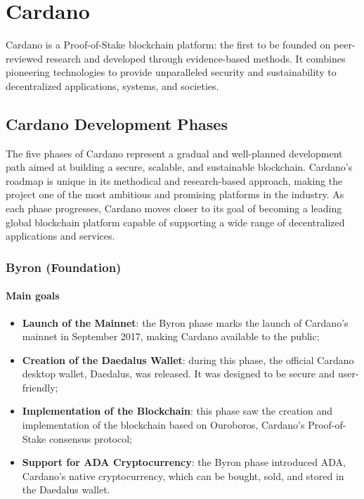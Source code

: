 \chapter{Cardano}

Cardano is a \gls{Proof-of-Stake} blockchain platform: the first 
to be founded on peer-reviewed research and developed through 
evidence-based methods. It combines pioneering technologies 
to provide unparalleled security and sustainability to decentralized 
applications, systems, and societies.

\section{Cardano Development Phases}

The five phases of Cardano represent a gradual and well-planned development 
path aimed at building a secure, scalable, and sustainable blockchain. 
Cardano's roadmap is unique in its methodical and research-based approach, 
making the project one of the most ambitious and promising platforms in the 
industry. As each phase progresses, Cardano moves closer to its goal of 
becoming a leading global blockchain platform capable of supporting a wide 
range of decentralized applications and services.

\vspace{0.2cm}

\subsection{Byron (Foundation)}

\subsubsection*{Main goals}
\begin{itemize}
    \item \textbf{Launch of the Mainnet}: the Byron phase marks the launch of 
        Cardano's mainnet in September 2017, making Cardano available 
        to the public;
    \item \textbf{Creation of the Daedalus Wallet}: during this phase, the 
        official Cardano desktop wallet, Daedalus, was released. It was 
        designed to be secure and user-friendly;

    \item \textbf{Implementation of the Blockchain}: this phase saw the 
        creation and implementation of the blockchain based on Ouroboros, 
        Cardano's Proof-of-Stake consensus protocol;

    \item \textbf{Support for ADA Cryptocurrency}: the Byron phase introduced 
        ADA, Cardano's native cryptocurrency, which can be bought, sold, and 
        stored in the Daedalus wallet.
\end{itemize}

